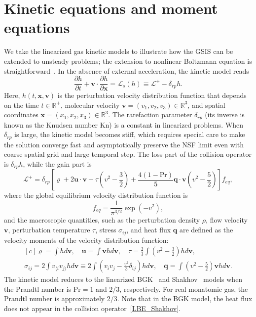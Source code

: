 \documentclass[onefignum,onetabnum]{siamart171218}
\begin{document}
\section{Kinetic equations and moment equations}\label{kinetic_equations}

We take the linearized gas kinetic models to illustrate how the GSIS can be extended to unsteady problems; the extension to nonlinear Boltzmann equation is straightforward~\cite{SuArXiv2019,Zhu2021JCP}. In the absence of external acceleration, the kinetic model reads
\begin{equation}\label{bgkfd}
\frac{\partial h}{\partial t}
+\bm{v} \cdot  \frac{\partial h}{\partial \bm{x}} =\mathcal{L}_s(h)\equiv\mathcal{L}^{+}- \delta_{rp}  h. 
\end{equation}
Here, $h(t,\bm{x},\bm{v})$ is the perturbation velocity distribution function that depends on the time $t\in\mathbb{R}^+$, molecular velocity $\bm{v}=(v_1,v_2,v_3)\in\mathbb{R}^3$, and spatial coordinates $\bm{x}=(x_1,x_2,x_3)\in\mathbb{R}^3$. 
The rarefaction parameter $\delta_{rp}$ (its inverse is known as the Knudsen number $\text{Kn}$) is a constant in linearized problems. When $\delta_{rp}$ is large, the kinetic model becomes stiff, which requires special care to make the solution converge fast and asymptotically preserve the NSF limit even with coarse spatial grid and large temporal step. The loss part of the collision operator is $\delta_{rp}h$, while the gain part is~\cite{Shakhov1968} 
\begin{equation}\label{LBE_Shakhov}
\mathcal{L}^+=\delta_{rp}\left[\varrho+2\bm{u}\cdot\bm{v}+\tau\left(v^2-\frac{3}{2}\right)+\frac{4(1-\text{Pr})}{5}\bm{q}\cdot{\bm{v}}\left(v^2-\frac{5}{2}\right)\right]f_{eq},
\end{equation} 
where the global equilibrium velocity distribution function is
\begin{equation}
f_{eq}=\frac{1}{\pi^{3/2}}\exp(-v^2),
\end{equation}
and
the macroscopic quantities, such as the perturbation density $\rho$, flow velocity $\bm{v}$, perturbation temperature $\tau$, stress $\sigma_{ij}$, and heat flux $\bm{q}$ are defined as the velocity moments of the velocity distribution function: 
\begin{equation}\label{MP}
\begin{aligned}[c]
\varrho=\int{h}d\bm{v}, \quad 
\bm{u}=\int{\bm{v}h}d\bm{v}, \quad 
\tau=\frac{2}{3}\int\left({v^2}-\frac{3}{2}\right)hd\bm{v}, \\
\sigma_{ij}=2\int{v_{\langle{i}}v_{j\rangle}h}d\bm{v}
\equiv{}2\int\left(v_iv_j-\frac{v^2}{3}\delta_{ij}\right){h}d\bm{v}, \quad
\bm{q}=\int\left({v^2}-\frac{5}{2}\right)\bm{v}hd\bm{v}.
\end{aligned}
\end{equation}
The kinetic model reduces to the linearized BGK~\cite{Bhatnagar1954} and Shakhov~\cite{Shakhov_S} models when the Prandtl number is $\text{Pr}=1$ and $2/3$, respectively.  For real monatomic gas, the Prandtl number is approximately 2/3. Note that in the BGK model, the heat flux does not appear in the collision operator~\eqref{LBE_Shakhov}.
\end{document}
